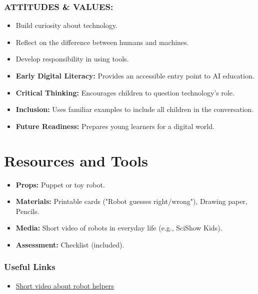 \documentclass[11pt, a4paper]{article}
\begin{document}
\subsubsection*{ATTITUDES \& VALUES:}
\begin{itemize}
    \item Build curiosity about technology.
    \item Reflect on the difference between humans and machines.
    \item Develop responsibility in using tools.
\end{itemize}

\begin{eurobox}
\begin{itemize}
    \item \textbf{Early Digital Literacy:} Provides an accessible entry point to AI education.
    \item \textbf{Critical Thinking:} Encourages children to question technology's role.
    \item \textbf{Inclusion:} Uses familiar examples to include all children in the conversation.
    \item \textbf{Future Readiness:} Prepares young learners for a digital world.
\end{itemize}
\end{eurobox}

\newpage
\section{Resources and Tools}
\begin{itemize}
    \item \textbf{Props:} Puppet or toy robot.
    \item \textbf{Materials:} Printable cards ("Robot guesses right/wrong"), Drawing paper, Pencils.
    \item \textbf{Media:} Short video of robots in everyday life (e.g., SciShow Kids).
    \item \textbf{Assessment:} Checklist (included).
\end{itemize}

\subsubsection*{Useful Links}
\begin{itemize}
    \item \href{https://www.youtube.com/watch?v=R5Jg3-F5C3E}{Short video about robot helpers}
\end{itemize}
\end{document}
